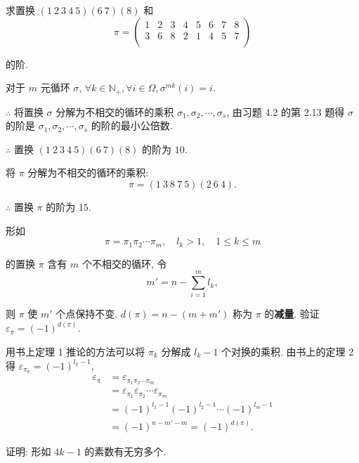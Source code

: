 \documentclass{ctexart}
\begin{document}
\addtocounter{exsection}{1}
\begin{exercise}%
    求置换 $(1\ 2\ 3\ 4\ 5)(6\ 7)(8)$ 和
    \[\pi=\begin{pmatrix}
        1 & 2 & 3 & 4 & 5 & 6 & 7 & 8 \\
        3 & 6 & 8 & 2 & 1 & 4 & 5 & 7 \\
    \end{pmatrix}\]

    的阶.
\end{exercise}
\begin{solution}
    对于 $m$ 元循环 $\sigma$, $\forall k\in\mathbb{N_+},\forall i\in\Omega,\sigma^{mk}(i)=i$.

    $\therefore$ 将置换 $\sigma$ 分解为不相交的循环的乘积 $\sigma_1,\sigma_2,\cdots,\sigma_s$, 由习题 4.2 的第 2.13 题得 $\sigma$ 的阶是 $\sigma_1,\sigma_2,\cdots,\sigma_s$ 的阶的最小公倍数.

    $\therefore$ 置换 $(1\ 2\ 3\ 4\ 5)(6\ 7)(8)$ 的阶为 $10$.

    将 $\pi$ 分解为不相交的循环的乘积:
    \[\pi=(1\ 3\ 8\ 7\ 5)(2\ 6\ 4).\]

    $\therefore$ 置换 $\pi$ 的阶为 $15$.
\end{solution}
\begin{exercise}%
    形如
    \[\pi=\pi_1\pi_2\cdots\pi_m,\quad l_k>1,\quad 1\leq k\leq m\]
    
    的置换 $\pi$ 含有 $m$ 个不相交的循环, 令
    \[m'=n-\sum\limits_{i=1}^{m}l_k,\]

    则 $\pi$ 使 $m'$ 个点保持不变. $d(\pi)=n-(m+m')$ 称为 $\pi$ 的\textbf{减量}. 验证 $\varepsilon_\pi=(-1)^{d(\pi)}$.
\end{exercise}
\begin{solution}
    用书上定理 1 推论的方法可以将 $\pi_k$ 分解成 $l_k-1$ 个对换的乘积. 由书上的定理 2 得 $\varepsilon_{\pi_k}=(-1)^{l_k-1}$,
    \begin{align*}
        \varepsilon_{\pi} & =\varepsilon_{\pi_1\pi_2\cdots\pi_m} \\
        & =\varepsilon_{\pi_1}\varepsilon_{\pi_2}\cdots\varepsilon_{\pi_m} \\
        & =(-1)^{l_1-1}(-1)^{l_2-1}\cdots(-1)^{l_m-1} \\
        & =(-1)^{n-m'-m}=(-1)^{d(\pi)}.
    \end{align*}
\end{solution}
\begin{exercise}%
    证明: 形如 $4k-1$ 的素数有无穷多个.
\end{exercise}
\end{document}
